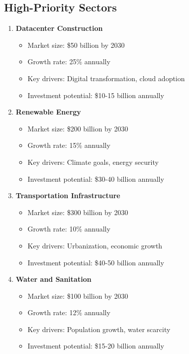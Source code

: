 \documentclass[business]{../templates/infraradar-main}
\begin{document}
\subsection{High-Priority Sectors}
\begin{enumerate}
    \item \textbf{Datacenter Construction}
    \begin{itemize}
        \item Market size: \$50 billion by 2030
        \item Growth rate: 25\% annually
        \item Key drivers: Digital transformation, cloud adoption
        \item Investment potential: \$10-15 billion annually
    \end{itemize}
    
    \item \textbf{Renewable Energy}
    \begin{itemize}
        \item Market size: \$200 billion by 2030
        \item Growth rate: 15\% annually
        \item Key drivers: Climate goals, energy security
        \item Investment potential: \$30-40 billion annually
    \end{itemize}
    
    \item \textbf{Transportation Infrastructure}
    \begin{itemize}
        \item Market size: \$300 billion by 2030
        \item Growth rate: 10\% annually
        \item Key drivers: Urbanization, economic growth
        \item Investment potential: \$40-50 billion annually
    \end{itemize}
    
    \item \textbf{Water and Sanitation}
    \begin{itemize}
        \item Market size: \$100 billion by 2030
        \item Growth rate: 12\% annually
        \item Key drivers: Population growth, water scarcity
        \item Investment potential: \$15-20 billion annually
    \end{itemize}
\end{enumerate}
\end{document}
